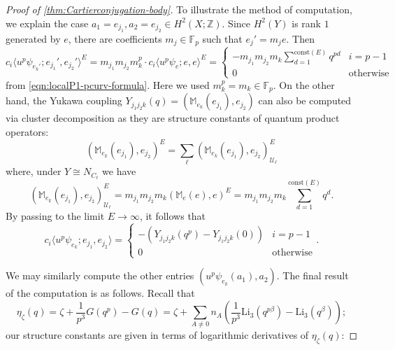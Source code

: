 \documentclass[reqno]{amsart}
\numberwithin{equation}{section}
\numberwithin{equation}{section}
\numberwithin{equation}{section}
\theoremstyle{definition}
\theoremstyle{remark}
\theoremstyle{remark}
\begin{document}
\begin{proof}[Proof of \cref{thm:Cartierconjugation-body}]
To illustrate the method of computation, we explain the case $a_1 = e_{j_1}, a_2 = e_{j_2} \in H^2(X;\mathbb{Z})$. Since $H^2(Y)$ is rank $1$ generated by $e$, there are coefficients $m_j \in \mathbb{F}_p$ such that $e_j' = m_j e$. Then
\begin{equation}
    c_i \langle u^p \psi_{e_k'}; e_{j_1}', e_{j_2}' \rangle^E = m_{j_1} m_{j_2} m_k^p \cdot  c_i \langle u^p \psi_e; e, e \rangle^E = \begin{cases} - m_{j_1} m_{j_2} m_k \sum_{d=1}^{\mathrm{const}(E)} q^{pd} & i = p-1 \\ 0 & \mbox{otherwise} \end{cases}
\end{equation}
from \cref{eqn:localP1-pcurv-formula}. Here we used $m_k^p = m_k \in \mathbb{F}_p$. On the other hand, the Yukawa coupling $Y_{{j_1}{j_2}k}(q)  = ( \mathbb{M}_{e_k}( e_{j_1}), e_{j_2} )$ can also be computed via cluster decomposition as they are structure constants of quantum product operators:
\begin{equation}
    ( \mathbb{M}_{e_k}( e_{j_1}), e_{j_2} )^E = \sum_\ell  ( \mathbb{M}_{e_k}( e_{j_1}), e_{j_2} )_{\mathcal{U}_\ell}^E 
\end{equation}
where, under $Y \cong N_{C_\ell}$ we have
\begin{equation}
    ( \mathbb{M}_{e_k}( e_{j_1}), e_{j_2} )_{\mathcal{U}_\ell}^E  = m_{j_1}m_{j_2}m_k ( \mathbb{M}_{e}( e), e )^E = m_{j_1}m_{j_2}m_k \sum_{d=1}^{\mathrm{const}(E)} q^d.
\end{equation}
By passing to the limit $E \to \infty$, it follows that
\begin{equation}
     c_i \langle u^p  \psi_{e_k}; e_{j_1}, e_{j_2} \rangle = \begin{cases} -(Y_{j_1 j_2 k} (q^p) - Y_{j_1j_2 k }(0)) & i = p-1 \\ 0 &\mbox{otherwise} \end{cases}.
\end{equation}

We may similarly compute the other entries  $\left(u^p  \psi_{e_k} (a_1) , a_2 \right)$. The final result of the computation is as follows. Recall that
\begin{equation}
    \eta_\zeta(q) = \zeta + \frac{1}{p^3} G(q^p) - G(q)  = \zeta + \sum_{A \neq 0} n_A \left( \frac{1}{p^3} \mathrm{Li}_3(q^{p\beta}) - \mathrm{Li}_3(q^\beta) \right);
\end{equation}
our structure constants are given in terms of logarithmic derivatives of $\eta_\zeta(q)$: 


\end{proof}
\end{document}
